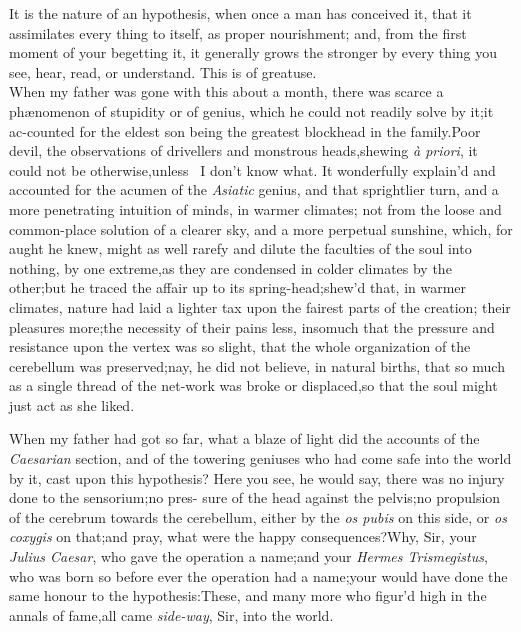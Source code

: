\documentclass{article}
\begin{document}
It is the nature of an hypothesis, when once a man has conceived
it, that it assimilates every thing to itself, as proper
nourishment; and, from the first moment of your begetting it, it
generally grows the stronger by every thing you see, hear, read, or
understand. This is of great\break use.\\
\newpage
When my father was gone with this about a month, there was
scarce a phæ\-nomenon of stupidity or of genius, which he could
not readily solve by it;\tsk it ac-\break counted for the eldest son
being the greatest blockhead in the family.\tsk Poor
devil, 
the observations of drivellers and monstrous heads,\tsk shewing \textit{à
priori}, it could not be otherwise,\tsk unless \astiv\ I
don’t know what. It wonderfully explain’d and accounted for
the acumen of the \textit{Asiatic} genius, and that sprightlier turn,
and a more penetrating intuition of minds, in warmer climates; not
from the loose and common-place solution of a clearer sky, and a
more perpetual sunshine, \etc\tsk\break which, for aught he knew,
might as well rarefy and dilute the faculties of the soul into
nothing, by one extreme,\tsk as they
are condensed in colder climates by the other;\tsh but he traced the affair up to
its spring-head;\tsk shew’d that, in warmer climates, nature had laid a lighter tax
upon the fairest parts of the creation;\tsk\break
their pleasures more;\tsk the necessity of their pains less, insomuch that the
pressure and resistance upon the vertex was so slight, that the whole organization
of the cerebellum was preserved;\tsh nay, he did not believe, in natural births,
that so much as a single thread of the net-work was broke or displaced,\tsh so that
the soul might just act as she liked.

When my father had got so far,\tsh\break
what a blaze of light did the accounts of the \textit{Caesarian} section, and of the
towering geniuses who had come safe into the world by it, cast upon
this hypothesis? Here you see, he would say, there was no injury
done to the sensorium;\tsk no pres- sure of the head against the
pelvis;\tsk no\break
propulsion of the cerebrum towards the
cerebellum, either by the \textit{os pubis} on this side, or \textit{os
coxygis} on that;\tsk and pray, what were the happy
consequences?\break Why, Sir, your \textit{Julius Caesar}, who gave the
operation a name;\tsk and your \textit{Hermes Trismegistus}, who
was born so before ever the operation had a name;\tsk your
would have done
the same honour to the hypothesis:\tsk These, and many
more who figur’d high in the annals of fame,\tsk all came
\textit{side-way}, Sir, into the world.
\end{document}
